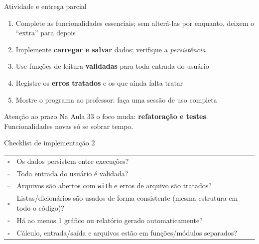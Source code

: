\documentclass[aspectratio=169,10pt,t]{beamer}
\begin{document}
\begin{frame}{Atividade e entrega parcial}
  \begin{enumerate}
    \item Complete as funcionalidades essenciais; sem alterá-las por enquanto, deixem o ``extra'' para depois
    \item Implemente \textbf{carregar e salvar} dados; verifique a \emph{persistência}
    \item Use funções de leitura \textbf{validadas} para toda entrada do usuário
    \item Registre os \textbf{erros tratados} e os que ainda falta tratar
    \item Mostre o programa ao professor: faça uma sessão de uso completa
  \end{enumerate}
  \begin{alertblock}{Atenção ao prazo}
    Na Aula 33 o foco muda: \textbf{refatoração e testes}. Funcionalidades novas só se sobrar tempo.
  \end{alertblock}
\end{frame}

\begin{frame}{Checklist de implementação 2}
  \small
  \begin{tabular}{@{}cl@{}}
    $\square$ & Os dados persistem entre execuções?\\
    $\square$ & Toda entrada do usuário é validada?\\
    $\square$ & Arquivos são abertos com \texttt{with} e erros de arquivo são tratados?\\
    $\square$ & Listas/dicionários são usados de forma consistente (mesma estrutura em todo o código)?\\
    $\square$ & Há ao menos 1 gráfico ou relatório gerado automaticamente?\\
    $\square$ & Cálculo, entrada/saída e arquivos estão em funções/módulos separados?\\
  \end{tabular}
\end{frame}
\end{document}
